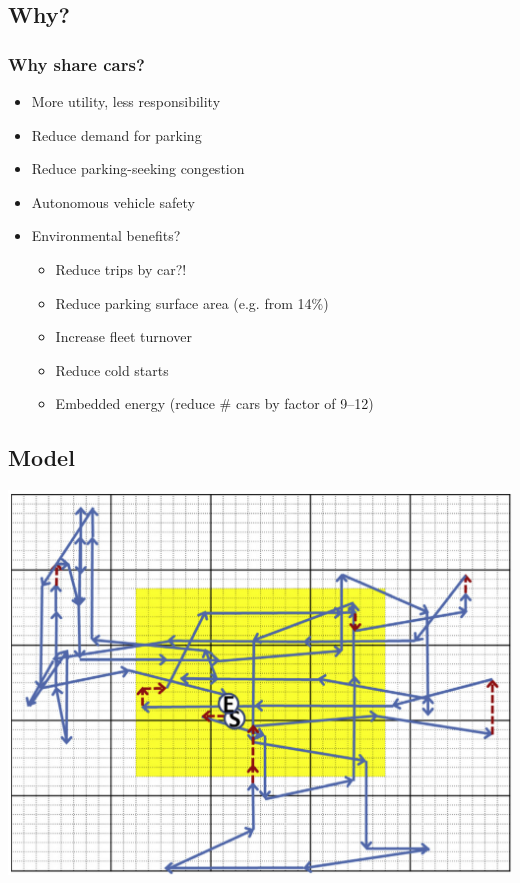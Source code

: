 \documentclass{beamer}
\begin{document}
\subsection{Why?}

\begin{frame}
  \frametitle{Why share cars?}
  \begin{itemize}
  \item More utility, less responsibility
  \item Reduce demand for parking
  \item Reduce parking-seeking congestion
  \item Autonomous vehicle safety
  \item Environmental benefits?
    \begin{itemize}
    \item Reduce trips by car?!
    \item Reduce parking surface area (e.g. from 14\%)
    \item Increase fleet turnover
    \item Reduce cold starts
    \item Embedded energy (reduce \# cars by factor of 9--12)
    \end{itemize}
  \end{itemize}
\end{frame}

\subsection{Model}

\begin{frame}
  \includegraphics[height=\textheight]{Fagnant-fig-5.jpg}
\end{frame}
\end{document}
